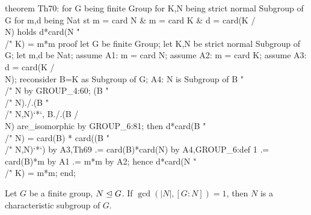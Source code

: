 \nwenddocs{}\endmoddef\nwstartdeflinemarkup{}\nwenddeflinemarkup
theorem Th70:
  for G being finite Group
  for K,N being strict normal Subgroup of G
  for m,d being Nat
  st m = card N & m = card K & d = card(K /\\ N)
  holds d*card(N "\\/" K) = m*m
proof
  let G be finite Group;
  let K,N be strict normal Subgroup of G;
  let m,d be Nat;
  assume A1: m = card N;
  assume A2: m = card K;
  assume A3: d = card(K /\\ N);
  reconsider B=K as Subgroup of G;
  A4: N is Subgroup of B "\\/" N by GROUP_4:60;
  (B "\\/" N)./.(B "\\/" N,N)`*`, B./.(B /\\ N) are_isomorphic by GROUP_6:81;
  then d*card(B "\\/" N) = card(B) * card((B "\\/" N,N)`*`) by A3,Th69
                       .= card(B)*card(N) by A4,GROUP_6:def 1
                       .= card(B)*m by A1
                       .= m*m by A2;
  hence d*card(N "\\/" K) = m*m;
end;
\eatline
{}\nwendcode{}\nwdocspar
\begin{theorem}
Let $G$ be a finite group, $N\trianglelefteq G$.
If $\gcd(|N|, [G:N])=1$, then $N$ is a characteristic subgroup of $G$.
\end{theorem}

